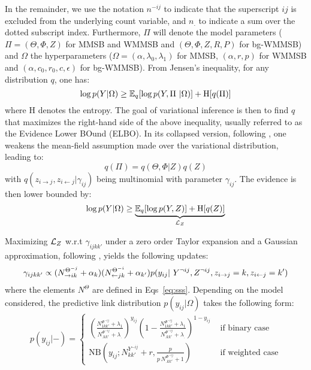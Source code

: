 In the remainder, we use the notation $n^{-ij}$ to indicate that the superscript $ij$ is excluded from the underlying count variable, and $n_{\bm{.}}$ to indicate a sum over the dotted subscript index. Furthermore, $\Pi$ will denote the model parameters ($\Pi = (\Theta,\Phi,Z)$ for MMSB and WMMSB and $(\Theta,\Phi,Z,R,P)$ for bg-WMMSB) and $\Omega$ the hyperparameters ($\Omega = (\alpha,\lambda_0,\lambda_1)$ for MMSB, $(\alpha,r,p)$ for WMMSB and $(\alpha, c_0, r_0, c, \epsilon)$ for bg-WMMSB). From Jensen's inequality, for any distribution $q$, one has:
%
\begin{equation*}
\log p(Y | \Omega) \ge \mathbb{E}_{q}[\log p(Y, \Pi\ | \Omega)] + \textrm{H}[q(\Pi)]
\end{equation*}
%
where $\textrm{H}$ denotes the entropy. The goal of variational inference is then to find $q$ that maximizes the right-hand side of the above inequality, usually referred to as the Evidence Lower BOund (ELBO). In its collapsed version, following \cite{teh2006collapsed}, one weakens the mean-field assumption made over the variational distribution, leading to:
%
\begin{equation*}
q(\Pi) = q(\Theta, \Phi | Z) q(Z)
\end{equation*}
%
with $q(z_{i \rightarrow j}, z_{i \leftarrow j}|\gamma_{ij})$ being multinomial with parameter $\gamma_{ij}$. The evidence is then lower bounded by:
%
\begin{equation*}
\log p(Y|\Omega) \geq \underbrace{\mathbb{E}_{q}[\log p(Y, Z)] + \textrm{H}[q(Z)]}_{\mathcal{L}_Z}
\end{equation*}

Maximizing $\mathcal{L}_Z$ w.r.t $\gamma_{ijkk'}$ under a zero order Taylor expansion and a Gaussian approximation, following \cite{teh2006collapsed,asuncion2009smoothing}, yields the following updates:
%
\begin{equation} \label{eq:maximization}
\gamma_{ijkk'} \propto (N_{\rightarrow ik}^{\Theta^{-j}} + \alpha_k) (N_{\leftarrow jk}^{\Theta^{-i}} + \alpha_{k'}) p(y_{ij} | Y^{\neg ij}, Z^{\neg ij}, \zij=k, \zji=k')
\end{equation}
%
where the elements $N^{\Theta}$ are defined in Eqs~\eqref{eq:sss}. Depending on the model considered, the predictive link distribution $p(y_{ij}|\Omega)$ takes the following form:
%
\begin{align*}
p(y_{ij} |-)=\begin{cases}
    \left( \frac{ N^{\Phi^{-ij}}_{1 kk'} + \lambda_1}{N^{\Phi^{-ij}}_{\bm{.}kk'} + \lambda_{\bm{.}}}\right)^{y_{ij}} \left( 1- \frac{ N^{\Phi^{-ij}}_{1 kk'} + \lambda_1}{N^{\Phi^{-ij}}_{\bm{.}kk'} + \lambda_{\bm{.}}}\right)^{1-y_{ij}}  & \textrm{ if binary case} \\
    \mathrm{NB}\left(y_{ij}; N^{Y^{-ij}}_{kk'} + r, \frac{p}{p\,N^{\Phi^{-ij}}_{\bm{.}kk'} + 1} \right) & \textrm{ if weighted case} 
\end{cases}
\end{align*}

